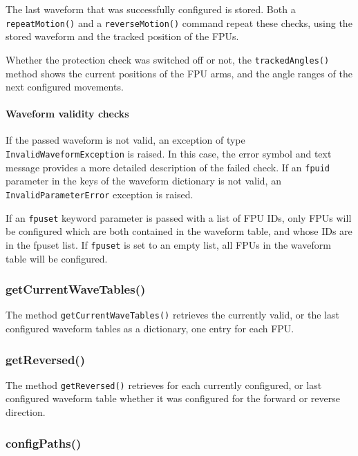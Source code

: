\documentclass[11pt,a4paper]{report}
\begin{document}
The last waveform that was successfully configured is stored. Both a
\texttt{repeatMotion()} and a \texttt{reverseMotion()} command repeat
these checks, using the stored waveform and the tracked position of
the FPUs.


Whether the protection check was switched off or not, the
\texttt{trackedAngles()} method shows the current positions of the FPU
arms, and the angle ranges of the next configured movements.




\paragraph{Waveform validity checks}
\begin{sloppypar}
If the passed waveform is not valid, an exception of type
\texttt{InvalidWaveformException} is raised. In this case, the error
symbol and text message provides a more detailed description of the
failed check. If an \texttt{fpuid} parameter in the keys of the waveform dictionary
is not valid, an \texttt{InvalidParameterError} exception is raised.
\end{sloppypar}

If an \texttt{fpuset} keyword parameter is passed with a list of FPU
IDs, only FPUs will be configured which are both contained in the
waveform table, and whose IDs are in the fpuset list. If
\texttt{fpuset} is set to an empty list, all FPUs in the waveform
table will be configured.


\subsubsection{getCurrentWaveTables()}
 The method
\texttt{getCurrentWaveTables()} retrieves the currently valid, or the
last configured waveform tables as a dictionary, one entry for each
FPU.


\subsubsection{getReversed()}
 The method \texttt{getReversed()}
retrieves for each currently configured, or last configured waveform
table whether it was configured for the forward or reverse direction.


\subsubsection{configPaths()}
\label{sec:configpaths}
\end{document}
